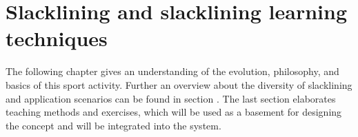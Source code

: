 \chapter{Slacklining  and slacklining learning techniques}\label{3_slacklining}
The following chapter \textit{} gives an understanding of the evolution, philosophy, and basics of this sport activity. Further an overview about the diversity of slacklining and application scenarios can be found in section \textit{}. The last section \textit{} elaborates teaching methods and exercises, which will be used as a basement for designing the concept and will be integrated into the system.
 

 
 
 
 
 
  